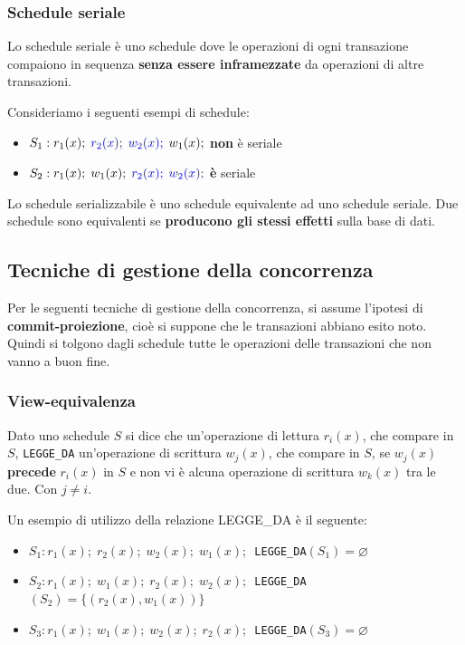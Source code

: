 \documentclass[a4paper]{article}
\begin{document}
\subsubsection{Schedule seriale}
Lo schedule seriale è uno schedule dove le operazioni di ogni
transazione compaiono in sequenza \textbf{senza essere inframezzate} da operazioni
di altre transazioni.
\begin{Example}{}{}
  Consideriamo i seguenti esempi di schedule:
  \begin{itemize}
    \item \( S_1: r_1(x); \; \color{blue}r_2(x); \; w_2(x); \; \color{black}w_1(x); \)
      \textbf{non} è seriale

    \item \( S_2: r_1(x); \; w_1(x); \; \color{blue} r_2(x); \; w_2(x); \)
      \textbf{è} seriale
  \end{itemize}
\end{Example}

{
  Lo schedule serializzabile è uno schedule equivalente ad uno schedule
  seriale. Due schedule sono equivalenti se \textbf{producono gli stessi effetti}
  sulla base di dati.
}

\subsection{Tecniche di gestione della concorrenza}
Per le seguenti tecniche di gestione della concorrenza, si assume l'ipotesi di
\textbf{commit-proiezione}, cioè si suppone che le transazioni abbiano esito noto.
Quindi si tolgono dagli schedule tutte le operazioni delle transazioni che non vanno
a buon fine.

\subsubsection{View-equivalenza}

{
  Dato uno schedule \( S \) si dice che un'operazione di lettura \( r_i(x) \), che
  compare in \( S \), \texttt{LEGGE\_DA} un'operazione di scrittura \( w_j(x) \), che
  compare in \( S \), se \( w_j(x) \) \textbf{precede} \( r_i(x) \) in \( S \) e non
  vi è alcuna operazione di scrittura \( w_k(x) \) tra le due. Con \( j \neq i \).

  \begin{Example}{}{}
    Un esempio di utilizzo della relazione LEGGE\_DA è il seguente:
    \begin{itemize}
      \item \( S_1: r_1(x);\; r_2(x);\; w_2(x);\; w_1(x);\, \)
        \texttt{LEGGE\_DA}\( (S_1) = \varnothing \)

      \item \( S_2: r_1(x);\; w_1(x);\; r_2(x);\; w_2(x);\, \)
        \texttt{LEGGE\_DA}\( (S_2) = \{ (r_2(x), w_1(x)) \} \)

      \item \( S_3: r_1(x);\; w_1(x);\; w_2(x);\; r_2(x);\, \)
        \texttt{LEGGE\_DA}\( (S_3) = \varnothing \)
    \end{itemize}
  \end{Example}
}
\end{document}
